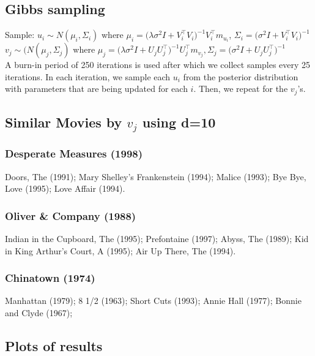 \documentclass{article}
\begin{document}
\subsection{Gibbs sampling}
Sample:
$u_i \sim N(\mu_i, \Sigma_i)$ where $\mu_i = \big(\lambda \sigma^2 I + V_i^\top V_i \big)^{-1} V_i^\top m_{u_i}$, $\Sigma_i = \big(\sigma^2 I + V_i^\top V_i \big)^{-1}$ \\
$v_j \sim(N(\mu_j, \Sigma_j)$ where $\mu_j = \big(\lambda \sigma^2 I + U_j U_j^\top \big)^{-1} U_j^\top m_{v_j}, \Sigma_j = \big(\sigma^2 I + U_j U_j^\top \big)^{-1}$\\

\noindent
A burn-in period of 250 iterations is used after which we collect samples every 25 iterations.  In each iteration, we sample each $u_i$ from the posterior distribution with parameters that are being updated for each $i$.  Then, we repeat for the $v_j$'s.

\subsection{Similar Movies by $v_j$ using d=10}
\subsubsection{Desperate Measures (1998)}
Doors, The (1991);
Mary Shelley's Frankenstein (1994);
Malice (1993);
Bye Bye, Love (1995);
Love Affair (1994).

\subsubsection{Oliver \& Company (1988)}
Indian in the Cupboard, The (1995);
Prefontaine (1997);
Abyss, The (1989);
Kid in King Arthur's Court, A (1995);
Air Up There, The (1994).

\subsubsection{Chinatown (1974)}
Manhattan (1979);
8 1/2 (1963);
Short Cuts (1993);
Annie Hall (1977);
Bonnie and Clyde (1967);


\subsection{Plots of results}
\end{document}
